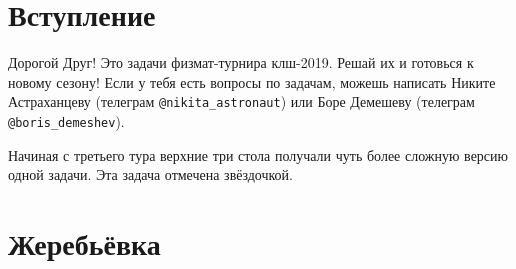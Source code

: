 \documentclass[12pt]{article} %
\begin{document}
\section*{Вступление}

Дорогой Друг! Это задачи физмат-турнира клш-2019. Решай их и готовься к новому сезону! 
Если у тебя есть вопросы по задачам, можешь написать Никите Астраханцеву (телеграм \verb|@nikita_astronaut|) или Боре Демешеву (телеграм \verb|@boris_demeshev|).

Начиная с третьего тура верхние три стола получали чуть более сложную версию одной задачи. 
Эта задача отмечена звёздочкой. 

\section*{Жеребьёвка}
\end{document}
